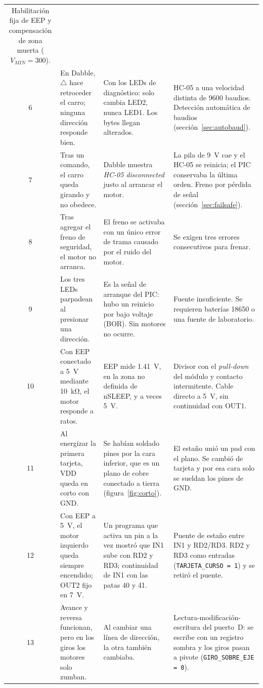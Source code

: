 \begin{table}[H]
\begin{tabularx}{\textwidth}{@{}c >{\raggedright\arraybackslash}p{2.9cm} L L@{}}
      Habilitación fija de EEP y compensación de zona muerta ($V_{MIN} = 300$). \\
    6 & En Dabble, $\triangle$ hace retroceder el carro; ninguna dirección responde bien. &
      Con los LEDs de diagnóstico: solo cambia LED2, nunca LED1. Los bytes llegan alterados. &
      HC-05 a una velocidad distinta de 9600 baudios. Detección automática de baudios (sección~\ref{sec:autobaud}). \\
    7 & Tras un comando, el carro queda girando y no obedece. &
      Dabble muestra \emph{HC-05 disconnected} justo al arrancar el motor. &
      La pila de \SI{9}{\volt} cae y el HC-05 se reinicia; el PIC conservaba la última orden. Freno por pérdida de señal (sección~\ref{sec:failsafe}). \\
    8 & Tras agregar el freno de seguridad, el motor no arranca. &
      El freno se activaba con un único error de trama causado por el ruido del motor. &
      Se exigen tres errores consecutivos para frenar. \\
    9 & Los tres LEDs parpadean al presionar una dirección. &
      Es la señal de arranque del PIC: hubo un reinicio por bajo voltaje (BOR). Sin motores no ocurre. &
      Fuente insuficiente. Se requieren baterías 18650 o una fuente de laboratorio. \\
    10 & Con EEP conectado a \SI{5}{\volt} mediante \SI{10}{\kilo\ohm}, el motor responde a ratos. &
      EEP mide \SI{1.41}{\volt}, en la zona no definida de nSLEEP, y a veces \SI{5}{\volt}. &
      Divisor con el \emph{pull-down} del módulo y contacto intermitente. Cable directo a \SI{5}{\volt}, sin continuidad con OUT1. \\
    11 & Al energizar la primera tarjeta, VDD queda en corto con GND. &
      Se habían soldado pines por la cara inferior, que es un plano de cobre conectado a tierra (figura~\ref{fig:corto}). &
      El estaño unió un pad con el plano. Se cambió de tarjeta y por esa cara solo se sueldan los pines de GND. \\
    12 & Con EEP a \SI{5}{\volt}, el motor izquierdo queda siempre encendido; OUT2 fijo en \SI{7}{\volt}. &
      Un programa que activa un pin a la vez mostró que IN1 sube con RD2 y RD3; continuidad de IN1 con las patas 40 y 41. &
      Puente de estaño entre IN1 y RD2/RD3. RD2 y RD3 como entradas (\texttt{TARJETA\_CURSO = 1}) y se retiró el puente. \\
    13 & Avance y reversa funcionan, pero en los giros los motores solo zumban. &
      Al cambiar una línea de dirección, la otra también cambiaba. &
      Lectura-modificación-escritura del puerto~D: se escribe con un registro sombra y los giros pasan a pivote (\texttt{GIRO\_SOBRE\_EJE = 0}). \\
    \bottomrule
  \end{tabularx}
\end{table}

